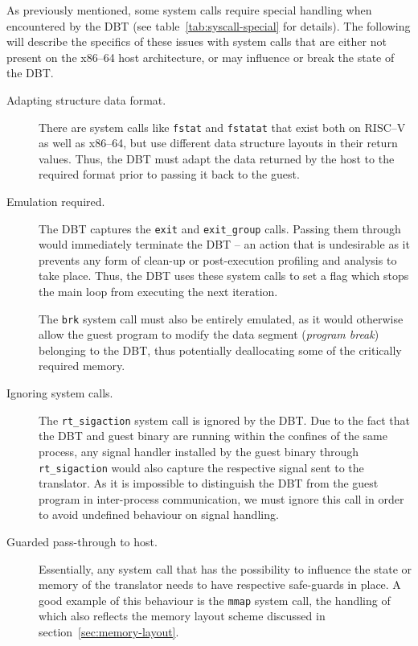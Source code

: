 As previously mentioned, some system calls require special handling when encountered by the DBT (see table~\vref{tab:syscall-special} for details).
The following will describe the specifics of these issues with system calls that are either not present on the x86--64 host architecture, or may influence or break the state of the DBT\@.
\begin{description}
	\item[Adapting structure data format.]
	There are system calls like \texttt{fstat} and \texttt{fstatat} that exist both on RISC--V as well as x86--64, but use different data structure layouts in their return values.
	Thus, the DBT must adapt the data returned by the host to the required format prior to passing it back to the guest.
	
	
	\item[Emulation required.]
	The DBT captures the \texttt{exit} and \texttt{exit\_group} calls.
	Passing them through would immediately terminate the DBT -- an action that is undesirable as it prevents any form of clean-up or post-execution profiling and analysis to take place.
	Thus, the DBT uses these system calls to set a flag which stops the main loop from executing the next iteration.
	
	The \texttt{brk} system call must also be entirely emulated, as it would otherwise allow the guest program to modify the data segment (\textit{program break}) belonging to the DBT, thus potentially deallocating some of the critically required memory.
	
	
	\item[Ignoring system calls.]
	The \texttt{rt\_sigaction} system call is ignored by the DBT\@.
	Due to the fact that the DBT and guest binary are running within the confines of the same process, any signal handler installed by the guest binary through \texttt{rt\_sigaction} would also capture the respective signal sent to the translator.
	As it is impossible to distinguish the DBT from the guest program in inter-process communication, we must ignore this call in order to avoid undefined behaviour on signal handling.
	
	
	\item[Guarded pass-through to host.]
	Essentially, any system call that has the possibility to influence the state or memory of the translator needs to have respective safe-guards in place.
	A good example of this behaviour is the \texttt{mmap} system call, the handling of which also reflects the memory layout scheme discussed in section~\vref{sec:memory-layout}.
	

\end{description}
